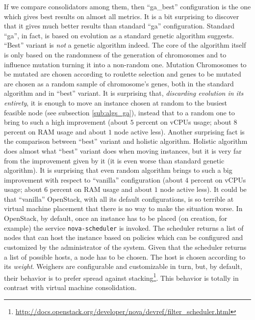 If we compare consolidators among them, then ``ga\_best'' configuration is the one which gives best results on almost all metrics. It is a bit surprising to discover that it gives much better results than standard ``ga'' configuration. Standard ``ga'', in fact, is based on evolution as a standard genetic algorithm suggests. ``Best'' variant is \emph{not} a genetic algorithm indeed. The core of the algorithm itself is only based on the randomness of the generation of chromosomes and to influence mutation turning it into a non-random one. Mutation Chromosomes to be mutated are chosen according to roulette selection and genes to be mutated are chosen as a random sample of chromosome's genes, both in the standard algorithm and in ``best'' variant. It is surprising that, \emph{discarding evolution in its entirety}, it is enough to move an instance chosen at random to the busiest feasible node (see subsection \ref{sub:algs_ga}), instead that to a random one to bring to such a high improvement (about $5$ percent on vCPUs usage; about $8$ percent on RAM usage and about $1$ node active less). Another surprising fact is the comparison between ``best'' variant and holistic algorithm. Holistic algorithm does almost what ``best'' variant does when moving instances, but it is very far from the improvement given by it (it is even worse than standard genetic algorithm). It is surprising that even random algorithm brings to such a big improvement with respect to ``vanilla'' configuration (about $4$ percent on vCPUs usage; about $6$ percent on RAM usage and about $1$ node active less). It could be that ``vanilla'' OpenStack, with all its default configurations, is so terrible at virtual machine placement that there is no way to make the situation worse. In OpenStack, by default, once an instance has to be placed (on creation, for example) the service \texttt{nova-scheduler} is invoked. The scheduler returns a list of nodes that can host the instance based on policies which can be configured and customized by the administrator of the system. Given that the scheduler returns a list of possible hosts, a node has to be chosen. The host is chosen according to its \emph{weight}. Weighers are configurable and customizable in turn, but, by default, their behavior is to prefer spread against stacking\footnote{\url{http://docs.openstack.org/developer/nova/devref/filter\_scheduler.html}}. This behavior is totally in contrast with virtual machine consolidation.

